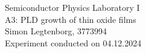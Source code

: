 \begin{centering}
	\huge Semiconductor Physics Laboratory \RN{1}\\
	\LARGE A3: PLD growth of thin oxide films\\
	\vspace{0.35cm}
	\normalsize Simon Legtenborg, 3773994 \\ 
	\normalsize Experiment conducted on 04.12.2024 \\
	\vspace{1cm}
\end{centering}
